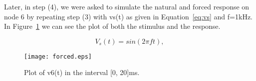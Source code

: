 Later, in step (4), we were asked to simulate the natural and forced response on node 6 by repeating step (3) with vs(t) as given in Equation~\ref{eq:vs} and f=1kHz. In Figure~\ref{fig:plot(4)} we can see the plot of both the stimulus and the response.

\begin{equation}
  V_{s}(t) = sin(2 \pi f t),
  \label{eq:vs}
\end{equation}

\begin{figure}[h] \centering
\texttt{[image: forced.eps]}
\caption{Plot of v6(t) in the interval [0, 20]ms.}
\label{fig:plot(4)}
\end{figure}





